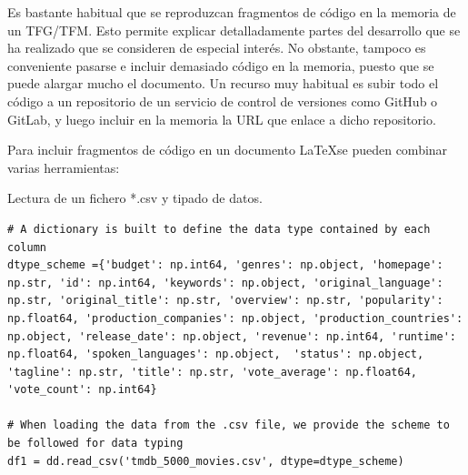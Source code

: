 \documentclass[a4paper, 12pt]{book}
\begin{document}
Es bastante habitual que se reproduzcan fragmentos de código en la memoria de un TFG/TFM.
Esto permite explicar detalladamente partes del desarrollo que se ha realizado que se consideren
de especial interés. No obstante, tampoco es conveniente pasarse e incluir demasiado código en
la memoria, puesto que se puede alargar mucho el documento. Un recurso muy habitual es subir
todo el código a un repositorio de un servicio de control de versiones como GitHub o GitLab,
y luego incluir en la memoria la URL que enlace a dicho repositorio.

Para incluir fragmentos de código en un documento \LaTeX se pueden combinar varias
herramientas:


\begin{listing}[h!]
    \caption{Lectura de un fichero *.csv y tipado de datos.}{}
    \label{lst:1}
    \begin{verbatim}
# A dictionary is built to define the data type contained by each column
dtype_scheme ={'budget': np.int64, 'genres': np.object, 'homepage': np.str, 'id': np.int64, 'keywords': np.object, 'original_language': np.str, 'original_title': np.str, 'overview': np.str, 'popularity': np.float64, 'production_companies': np.object, 'production_countries': np.object, 'release_date': np.object, 'revenue': np.int64, 'runtime': np.float64, 'spoken_languages': np.object,  'status': np.object, 'tagline': np.str, 'title': np.str, 'vote_average': np.float64, 'vote_count': np.int64}

# When loading the data from the .csv file, we provide the scheme to be followed for data typing
df1 = dd.read_csv('tmdb_5000_movies.csv', dtype=dtype_scheme)
    \end{verbatim}
\end{listing}
\end{document}
